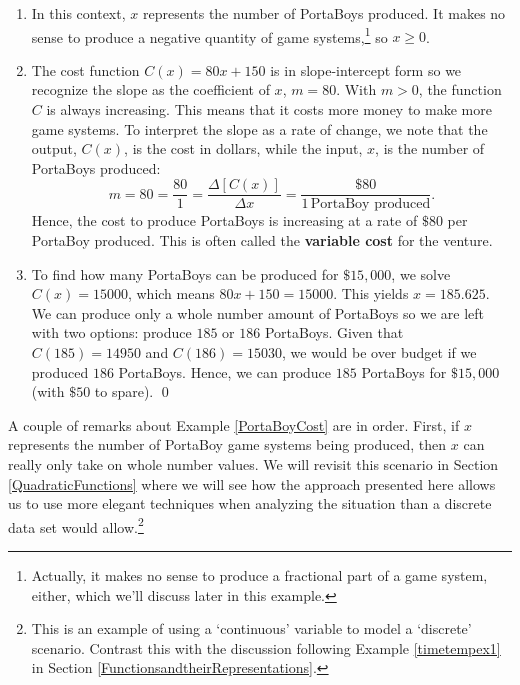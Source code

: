 \documentclass{ximera}
\begin{document}
\begin{example}
\begin{enumerate}
\begin{center}
\end{center}

\item   In this context, $x$ represents the number of PortaBoys produced.  It makes no sense to produce a negative quantity of game systems,\footnote{Actually, it makes no sense to produce a fractional part of a game system, either, which we'll discuss later in this example.}  so $x \geq 0$.


\item  The cost function $C(x)= 80x + 150$ is in slope-intercept form so we recognize the slope as the coefficient of $x$, $m = 80$.  With $m > 0$, the function $C$ is always increasing.  This means that it costs more money to make more game systems.  To interpret the slope as a rate of change, we note that the output, $C(x)$, is the cost in dollars, while the input, $x$,  is the number of PortaBoys produced:  \[ m = 80 = \dfrac{80}{1} =  \dfrac{\Delta [C(x)]}{\Delta x} = \dfrac{\$ 80}{1 \, \mbox{PortaBoy produced}}.\]  Hence, the cost to produce PortaBoys is increasing at a rate of $\$80$ per PortaBoy produced.  This is often called the \textbf{variable cost} for the venture. 


\item  To find how many PortaBoys can be produced for $\$15, \! 000$, we solve $C(x) = 15000$, which means $80x+150 = 15000$.  This yields  $x = 185.625$.  We can produce only a whole number amount of PortaBoys so we are left with two options: produce $185$ or $186$ PortaBoys.  Given that $C(185) =  14950$ and $C(186) = 15030$, we would be over budget if we produced $186$ PortaBoys.  Hence, we can produce $185$ PortaBoys for $\$15, \! 000$ (with $\$50$ to spare). \qed

\end{enumerate}

\end{example}

A couple of remarks about Example \ref{PortaBoyCost} are in order.  First, if $x$ represents the number of PortaBoy game systems being produced, then $x$ can really only take on whole number values.  We will revisit this scenario in Section \ref{QuadraticFunctions} where we will see how the approach presented here allows us to use more elegant techniques when analyzing the situation than a discrete data set would allow.\footnote{This is an example of using a `continuous' variable to model a `discrete' scenario.  Contrast this with the discussion following Example \ref{timetempex1} in Section \ref{FunctionsandtheirRepresentations}.} 
\end{document}
